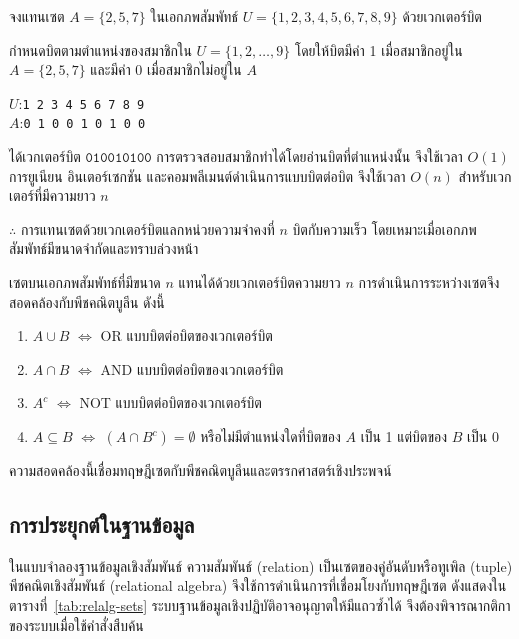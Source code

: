 \begin{ex}
\label{ex:bit-vector}
จงแทนเซต $A = \{2, 5, 7\}$ ในเอกภพสัมพัทธ์ $U = \{1, 2, 3, 4, 5, 6, 7, 8, 9\}$ ด้วยเวกเตอร์บิต
\end{ex}
\begin{solution}
กำหนดบิตตามตำแหน่งของสมาชิกใน $U = \{1,2,\ldots,9\}$ โดยให้บิตมีค่า 1 เมื่อสมาชิกอยู่ใน $A = \{2,5,7\}$ และมีค่า 0 เมื่อสมาชิกไม่อยู่ใน $A$
\begin{center}
$U$:\quad \texttt{1 2 3 4 5 6 7 8 9}\\[2pt]
$A$:\quad \texttt{0 1 0 0 1 0 1 0 0}
\end{center}
ได้เวกเตอร์บิต $\texttt{010010100}$ การตรวจสอบสมาชิกทำได้โดยอ่านบิตที่ตำแหน่งนั้น จึงใช้เวลา $O(1)$ การยูเนียน อินเตอร์เซกชัน และคอมพลีเมนต์ดำเนินการแบบบิตต่อบิต จึงใช้เวลา $O(n)$ สำหรับเวกเตอร์ที่มีความยาว $n$

$\therefore$ การแทนเซตด้วยเวกเตอร์บิตแลกหน่วยความจำคงที่ $n$ บิตกับความเร็ว โดยเหมาะเมื่อเอกภพสัมพัทธ์มีขนาดจำกัดและทราบล่วงหน้า \solhere
\end{solution}

\begin{principle}
เซตบนเอกภพสัมพัทธ์ที่มีขนาด $n$ แทนได้ด้วยเวกเตอร์บิตความยาว $n$ การดำเนินการระหว่างเซตจึงสอดคล้องกับพีชคณิตบูลีน ดังนี้

\begin{enumerate}
    \item $A \cup B$ $\Leftrightarrow$ OR แบบบิตต่อบิตของเวกเตอร์บิต
    \item $A \cap B$ $\Leftrightarrow$ AND แบบบิตต่อบิตของเวกเตอร์บิต
    \item $A^c$ $\Leftrightarrow$ NOT แบบบิตต่อบิตของเวกเตอร์บิต
    \item $A \subseteq B$ $\Leftrightarrow$ $(A \cap B^c) = \emptyset$ หรือไม่มีตำแหน่งใดที่บิตของ $A$ เป็น 1 แต่บิตของ $B$ เป็น 0
\end{enumerate}

ความสอดคล้องนี้เชื่อมทฤษฎีเซตกับพีชคณิตบูลีนและตรรกศาสตร์เชิงประพจน์
\label{prin:set-boolean-algebra}
\end{principle}

\subsection{การประยุกต์ในฐานข้อมูล}

ในแบบจำลองฐานข้อมูลเชิงสัมพันธ์ ความสัมพันธ์ (relation) เป็นเซตของคู่อันดับหรือทูเพิล (tuple) พีชคณิตเชิงสัมพันธ์ (relational algebra) จึงใช้การดำเนินการที่เชื่อมโยงกับทฤษฎีเซต ดังแสดงในตารางที่~\ref{tab:relalg-sets} ระบบฐานข้อมูลเชิงปฏิบัติอาจอนุญาตให้มีแถวซ้ำได้ จึงต้องพิจารณากติกาของระบบเมื่อใช้คำสั่งสืบค้น~\parencite{codd1970relational}

